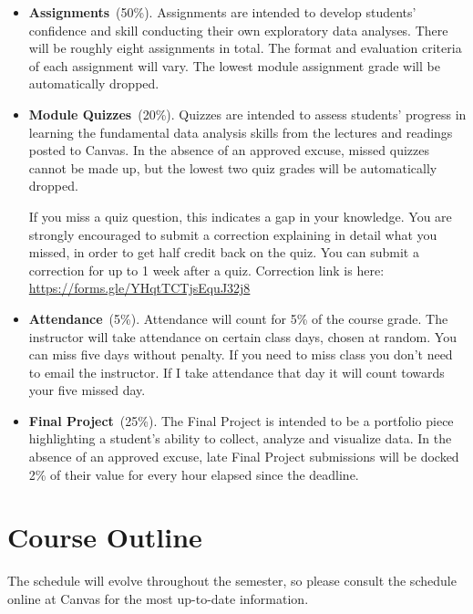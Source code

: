\documentclass[10pt]{memoir}
\begin{document}
\begin{itemize}%
    
    \item \textbf{Assignments}~(50\%). Assignments are intended to develop students' confidence and skill conducting their own exploratory data analyses. There will be roughly eight assignments in total. The format and evaluation criteria of each assignment will vary. The lowest module assignment grade will be automatically dropped.
    
    \item \textbf{Module Quizzes}~(20\%). Quizzes are intended to assess students' progress in learning the fundamental data analysis skills from the lectures and readings posted to Canvas. In the absence of an approved excuse, missed quizzes cannot be made up, but the lowest two quiz grades will be automatically dropped.


    If you miss a quiz question, this indicates a gap in your knowledge. You are strongly encouraged to submit a correction explaining in detail what you missed, in order to get half credit back on the quiz. You can submit a correction for up to 1 week after a quiz. Correction link is here: \url{https://forms.gle/YHqtTCTjsEquJ32j8}
    
    \item \textbf{Attendance}~(5\%). Attendance will count for 5\% of the course grade. The instructor will take attendance on certain class days, chosen at random. You can miss five days without penalty. If you need to miss class you don't need to email the instructor. If I take attendance that day it will count towards your five missed day.
    
    \item \textbf{Final Project}~(25\%). The Final Project is intended to be a portfolio piece highlighting a student's ability to collect, analyze and visualize data. In the absence of an approved excuse, late Final Project submissions will be docked 2\% of their value for every hour elapsed since the deadline.
\end{itemize}

\section{\textbf{Course Outline}}

The schedule will evolve throughout the semester, so please consult the schedule online at Canvas for the most up-to-date information.
\end{document}
